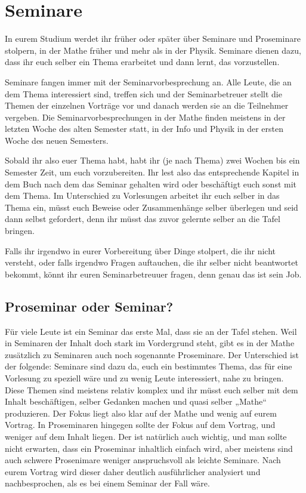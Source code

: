 \section{Seminare}

In eurem Studium werdet ihr früher oder später über Seminare und Proseminare stolpern, in der Mathe früher und mehr als in der Physik. Seminare dienen dazu, dass ihr euch selber ein Thema erarbeitet und dann lernt, das vorzustellen.

Seminare fangen immer mit der Seminarvorbesprechung an. Alle Leute, die an dem Thema interessiert sind, treffen sich und der Seminarbetreuer stellt die Themen der einzelnen Vorträge vor und danach werden sie an die Teilnehmer vergeben. Die Seminarvorbesprechungen in der Mathe finden meistens in der letzten Woche des alten Semester statt, in der Info und Physik in der ersten Woche des neuen Semesters.

Sobald ihr also euer Thema habt, habt ihr (je nach Thema) zwei Wochen bis ein Semester Zeit, um euch vorzubereiten. Ihr lest also das entsprechende Kapitel in dem Buch nach dem das Seminar gehalten wird oder beschäftigt euch sonst mit dem Thema. Im Unterschied zu Vorlesungen arbeitet ihr euch selber in das Thema ein, müsst euch Beweise oder Zusammenhänge selber überlegen und seid dann selbst gefordert, denn ihr müsst das zuvor gelernte selber an die Tafel bringen.

Falls ihr irgendwo in eurer Vorbereitung über Dinge stolpert, die ihr nicht versteht, oder falls irgendwo Fragen auftauchen, die ihr selber nicht beantwortet bekommt, könnt ihr euren Seminarbetreuuer fragen, denn genau das ist sein Job.

\subsection{Proseminar oder Seminar?}
Für viele Leute ist ein Seminar das erste Mal, dass sie an der Tafel stehen. Weil in Seminaren der Inhalt doch stark im Vordergrund steht, gibt es in der Mathe zusätzlich zu Seminaren auch noch sogenannte Proseminare. Der Unterschied ist der folgende: Seminare sind dazu da, euch ein bestimmtes Thema, das für eine Vorlesung zu speziell wäre und zu wenig Leute interessiert, nahe zu bringen. Diese Themen sind meistens relativ komplex und ihr müsst euch selber mit dem Inhalt beschäftigen, selber Gedanken machen und quasi selber „Mathe“ produzieren. Der Fokus liegt also klar auf der Mathe und wenig auf eurem Vortrag. In Proseminaren hingegen sollte der Fokus auf dem Vortrag, und weniger auf dem Inhalt liegen. Der ist natürlich auch wichtig, und man sollte nicht erwarten, dass ein Proseminar inhaltlich einfach wird, aber meistens sind auch schwere Prosenimare weniger anspruchsvoll als leichte Seminare. Nach eurem Vortrag wird dieser daher deutlich ausführlicher analysiert und nachbesprochen, als es bei einem Seminar der Fall wäre.

